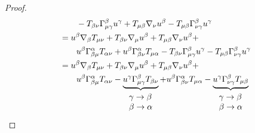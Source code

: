 \begin{proof}
\begin{equation}
\begin{aligned}
         & \qquad  - T_{\beta \nu}\Gamma^\beta_{\mu \gamma} u^\gamma +T_{\mu \beta } \mathbf{\nabla}_\nu u^\beta -  T_{\mu \beta } \Gamma^\beta_{\nu \gamma} u^\gamma \\
                                       & = u^\beta \mathbf{\nabla}_\beta T_{\mu \nu}+T_{\beta \nu}\mathbf{\nabla}_\mu u^\beta +T_{\mu \beta } \mathbf{\nabla}_\nu u^\beta +  \\
         &\qquad u^\beta \Gamma_{\beta \mu}^\alpha T_{\alpha \nu} + u^\beta \Gamma_{\beta \nu}^\alpha T_{\mu \alpha}- T_{\beta \nu}\Gamma^\beta_{\mu \gamma} u^\gamma  -  T_{\mu \beta } \Gamma^\beta_{\nu \gamma} u^\gamma                                                                                                                                                                \\
                                       & = u^\beta \mathbf{\nabla}_\beta T_{\mu \nu}+T_{\beta \nu}\mathbf{\nabla}_\mu u^\beta +T_{\mu \beta } \mathbf{\nabla}_\nu u^\beta +                                                                                        \\
        & \qquad u^\beta \Gamma_{\beta \mu}^\alpha T_{\alpha \nu}- \underbrace{u^\gamma\Gamma^\beta_{\mu \gamma}T_{\beta \nu}}_{\begin{array}{l}
                                                                                                                                    \gamma \rightarrow \beta \\
                                                                                                                                    \beta \rightarrow \alpha
                                                                                                                                \end{array}}  + u^\beta \Gamma_{\beta \nu}^\alpha T_{\mu \alpha}- \underbrace{u^\gamma \Gamma^\beta_{\nu \gamma}T_{\mu \beta }}_{\begin{array}{l}
                                                                                                                                                                                                                                                                         \gamma \rightarrow \beta \\
                                                                                                                                                                                                                                                                         \beta \rightarrow \alpha

\end{array}}
\end{aligned}
\end{equation}
\end{proof}
